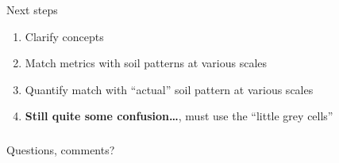 \documentclass[aspectratio=169]{beamer}
\begin{document}
\begin{frame}{Next steps}
\begin{enumerate}
    \item Clarify concepts
    \item Match metrics with soil patterns at various scales
    \item Quantify match with ``actual'' soil pattern at various scales
    \item \textbf{Still quite some confusion\ldots}, must use the ``little grey cells''
\end{enumerate}
\end{frame}



{  %
\begin{frame} 
\frametitle{}
\framesubtitle{}

 \begin{center}
 \vspace{0.5cm}
 \textcolor{isric_yellow}{\Large{Questions, comments?}}
 \end{center}
\end{frame} 
}

\end{document}
